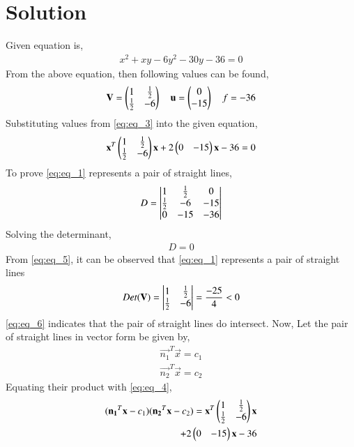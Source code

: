 \documentclass[journal,12pt,twocolumn]{IEEEtran}
\begin{document}
\section{Solution}
Given equation is,
\begin{align} \label{eq:eq_1}
    x^{2}+xy-6y^{2}-30y-36=0 
\end{align}
From the above equation, then following values can be found,
\begin{align} \label{eq:eq_3}
    \mathbf{V} = \begin{pmatrix}1 & \frac{1}{2} \\ \frac{1}{2} & -6\end{pmatrix} \quad \mathbf{u} = \begin{pmatrix}0 \\ -15\end{pmatrix} \quad f=-36
\end{align}
Substituting values from \eqref{eq:eq_3} into the given equation,
\begin{align} \label{eq:eq_4}
    \mathbf{x}^T\begin{pmatrix}1 & \frac{1}{2} \\ \frac{1}{2} & -6\end{pmatrix}\mathbf{x} +2\begin{pmatrix}0 & -15\end{pmatrix}\mathbf{x}-36=0
\end{align}
To prove \eqref{eq:eq_1} represents a pair of straight lines,
\begin{align} 
    D = \begin{vmatrix}1 & \frac{1}{2} & 0 \\ \frac{1}{2} & -6 & -15 \\ 0 & -15 & -36\end{vmatrix} \nonumber
\end{align}
Solving the determinant,
\begin{align} \label{eq:eq_5}
    D = 0
\end{align}
From \eqref{eq:eq_5}, it can be observed that \eqref{eq:eq_1} represents a pair of straight lines
\begin{align} \label{eq:eq_6}
    Det(\mathbf{V}) = \begin{vmatrix}1 & \frac{1}{2} \\ \frac{1}{2} & -6\end{vmatrix} = \frac{-25}{4} < 0
\end{align}
\eqref{eq:eq_6} indicates that the pair of straight lines do intersect. 
Now, Let the pair of straight lines in vector form be given by,
\begin{align}
    \vec{n_1}^T\vec{x}=c_1 \label{eq:eq_7}\\
    \vec{n_2}^T\vec{x}=c_2 \label{eq:eq_8}
\end{align}
Equating their product with \eqref{eq:eq_4},
\begin{align} 
    (\mathbf{n_1}^T\mathbf{x}-c_1)(\mathbf{n_2}^T\mathbf{x}-c_2)=\mathbf{x}^T\begin{pmatrix}1 & \frac{1}{2} \\ \frac{1}{2} & -6\end{pmatrix}\mathbf{x} \nonumber \\+2\begin{pmatrix}0 & -15\end{pmatrix}\mathbf{x}-36 \label{eq:eq_9}
\end{align}
\end{document}
